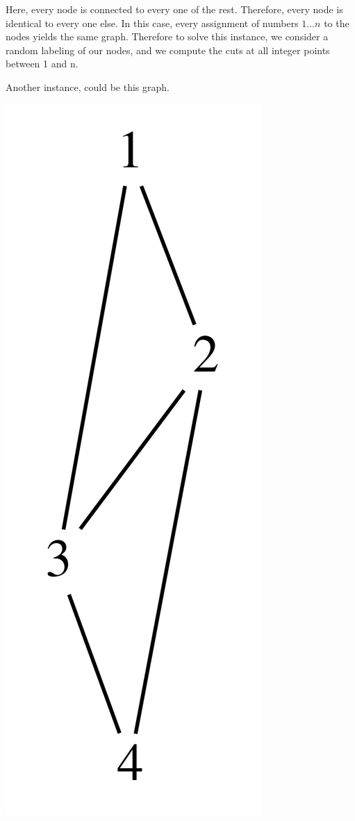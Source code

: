 Here, every node is connected to every one of the rest. Therefore, every node is identical to every one else. In this case, 
every assignment of numbers $1\ldots n$ to the nodes yields the same graph. Therefore to solve this instance, we consider a random labeling of our nodes, and we compute the cuts at all integer points between 1 and n. 


Another instance, could be this graph.

\begin{center}
\includegraphics[scale=0.1]{img/graph3.png}
\end{center}


